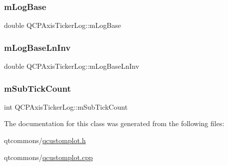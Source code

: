 \subsubsection{\texorpdfstring{mLogBase}{mLogBase}}
{\footnotesize\ttfamily double Q\+C\+P\+Axis\+Ticker\+Log\+::m\+Log\+Base\hspace{0.3cm}{\ttfamily [protected]}}

\mbox{\label{class_q_c_p_axis_ticker_log_aeba719bbeec39957f475ef89d6ae2fe7}} 
\subsubsection{\texorpdfstring{mLogBaseLnInv}{mLogBaseLnInv}}
{\footnotesize\ttfamily double Q\+C\+P\+Axis\+Ticker\+Log\+::m\+Log\+Base\+Ln\+Inv\hspace{0.3cm}{\ttfamily [protected]}}

\mbox{\label{class_q_c_p_axis_ticker_log_a3d92b729bedbbbd34ee5f74565defd95}} 
\subsubsection{\texorpdfstring{mSubTickCount}{mSubTickCount}}
{\footnotesize\ttfamily int Q\+C\+P\+Axis\+Ticker\+Log\+::m\+Sub\+Tick\+Count\hspace{0.3cm}{\ttfamily [protected]}}



The documentation for this class was generated from the following files\+:\begin{DoxyCompactItemize}
\item 
qtcommons/\mbox{\hyperlink{qcustomplot_8h}{qcustomplot.\+h}}\item 
qtcommons/\mbox{\hyperlink{qcustomplot_8cpp}{qcustomplot.\+cpp}}\end{DoxyCompactItemize}
